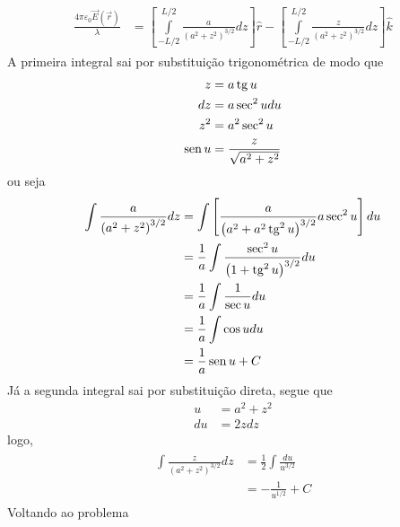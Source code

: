 \begin{prob}
\begin{sol}
\begin{align}
\begin{split}
			\frac{4 \pi \varepsilon_{0}\vec{E}(\vec{r})}{\lambda} &= \left[\int\limits_{-L/2}^{L/2}\frac{a}{\left(a^{2}+z^{2}\right)^{3/2}}dz \right]\hat{r} - \left[\int\limits_{-L/2}^{L/2}\frac{z}{\left(a^{2}+z^{2}\right)^{3/2}}dz\right]\hat{k}
		\end{split}
	\end{align}
	A primeira integral sai por substituição trigonométrica de modo que
	\begin{subequations}
		\begin{align}
			z &= a\operatorname{tg} u\\
			dz &= a \sec^{2}udu\\
			z^{2} &= a^{2}\sec^{2}u\\
			\operatorname{sen} u &= \frac{z}{\sqrt{a^{2}+z^{2}}}
		\end{align}
	\end{subequations}
	ou seja
	\begin{align}
			\begin{split}
				\int \frac{a}{\left(a^{2}+z^{2}\right)^{3/2}}dz &= \int \left[\frac{a}{\left(a^{2}+a^{2}\operatorname{tg}^{2}u\right)^{3/2}}a\sec^{2}u\right]du\\
																												&= \frac{1}{a}\int \frac{\sec^{2}u}{\left(1+\operatorname{tg}^{2}u\right)^{3/2}}du\\
																												&= \frac{1}{a}\int \frac{1}{\sec{u}}du\\
																												&= \frac{1}{a}\int \cos{u}du\\
																												&= \frac{1}{a}\operatorname{sen}{u}+C\\
			\end{split}
	\end{align}
	Já a segunda integral sai por substituição direta, segue que
	\begin{subequations}
		\begin{align}
			u &= a^{2}+z^{2}\\
			du &= 2zdz
		\end{align}
	\end{subequations}
	logo,
	\begin{align}
		\begin{split}
			\int \frac{z}{\left(a^{2}+z^{2}\right)^{3/2}}dz &= \frac{1}{2}\int \frac{du}{u^{3/2}}\\
																											&= -\frac{1}{u^{1/2}}+C
		\end{split}
	\end{align}
	Voltando ao problema
	\begin{align}
		\begin{split}

\end{split}
\end{align}
\end{sol}
\end{prob}
